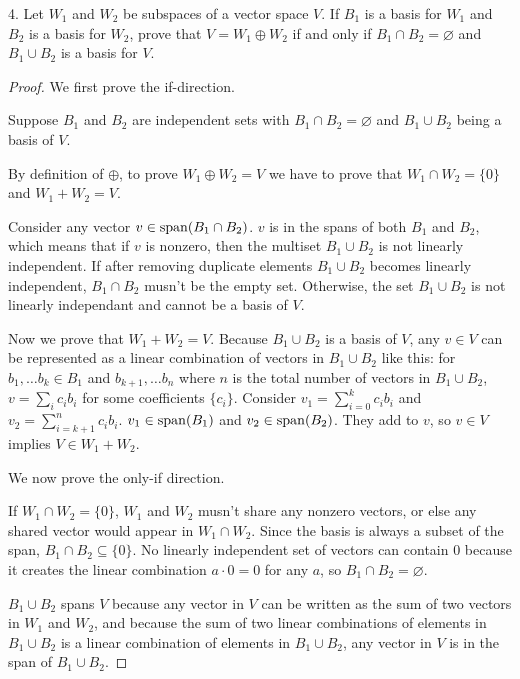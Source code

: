 \documentclass[12pt]{article} %
\newcommand{\s}{{\rm span}}
\begin{document}
\begin{flushleft}
\vspace{.5cm}

4.  Let $W_1$ and $W_2$ be subspaces of a vector space $V$.  If $B_1$ is a basis for $W_1$ and $B_2$ is a basis for $W_2$, prove that $V = W_1 \oplus W_2$ if and only if $B_1 \cap B_2 = \varnothing$ and $B_1 \cup B_2$ is a basis for $V$.

\begin{proof}
  We first prove the if-direction.

  Suppose $B_1$ and $B_2$ are independent sets with $B_1 \cap B_2 = \varnothing$ and $B_1 \cup B_2$ being a basis of $V$.
  
  By definition of $\oplus$, to prove $W_1\oplus W_2 = V$ we have to prove that $W_1\cap W_2 = \{0\}$ and $W_1 + W_2 = V$.

  Consider any vector $v\in \s(B_1\cap B_2)$. $v$ is in the spans of both $B_1$ and $B_2$, which means that if $v$ is nonzero, then the multiset $B_1\cup B_2$ is not linearly independent. If after removing duplicate elements $B_1 \cup B_2$ becomes linearly independent, $B_1 \cap B_2$ musn't be the empty set. Otherwise, the set $B_1 \cup B_2$ is not linearly independant and cannot be a basis of $V$.

  Now we prove that $W_1 + W_2 = V$. Because $B_1 \cup B_2$ is a basis of $V$, any $v\in V$ can be represented as a linear combination of vectors in $B_1 \cup B_2$ like this: for $b_1,\ldots b_k \in B_1$ and $b_{k+1},\ldots b_n$ where $n$ is the total number of vectors in $B_1 \cup B_2$, $v = \sum_{i} c_i b_i$ for some coefficients $\{c_i\}$. Consider $v_1 = \sum_{i=0}^k c_i b_i$ and $v_2 = \sum_{i=k+1}^n c_ib_i$. $v_1 \in \s(B_1)$ and $v_2 \in \s(B_2)$. They add to $v$, so $v \in V$ implies $V \in W_1 + W_2$.

  We now prove the only-if direction.

  If $W_1 \cap W_2 = \{0\}$, $W_1$ and $W_2$ musn't share any nonzero vectors, or else any shared vector would appear in $W_1 \cap W_2$. Since the basis is always a subset of the span, $B_1\cap B_2 \subseteq \{0\}$. No linearly independent set of vectors can contain $0$ because it creates the linear combination $a\cdot 0 = 0$ for any $a$, so $B_1 \cap B_2 = \varnothing$.

  $B_1 \cup B_2$ spans $V$ because any vector in $V$ can be written as the sum of two vectors in $W_1$ and $W_2$, and because the sum of two linear combinations of elements in $B_1 \cup B_2$ is a linear combination of elements in $B_1 \cup B_2$, any vector in $V$ is in the span of $B_1 \cup B_2$.


\end{proof}
\end{flushleft}
\end{document}
